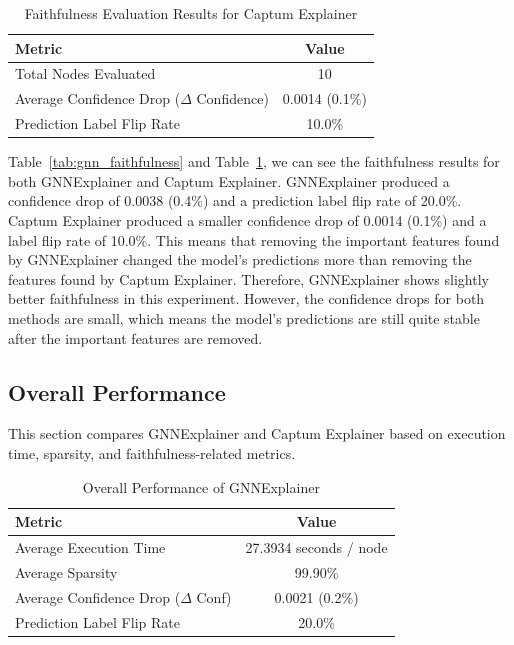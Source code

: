 \documentclass[runningheads]{llncs}
\begin{document}
\begin{table}[ht]
\centering
\caption{Faithfulness Evaluation Results for Captum Explainer}
\label{tab:captum_faithfulness}
\begin{tabular}{lc}
\hline
\textbf{Metric} & \textbf{Value} \\
\hline
Total Nodes Evaluated & 10 \\
Average Confidence Drop ($\Delta$ Confidence) & 0.0014 (0.1\%) \\
Prediction Label Flip Rate & 10.0\% \\
\hline
\end{tabular}
\end{table}

Table~\ref{tab:gnn_faithfulness} and Table~\ref{tab:captum_faithfulness}, we can see the faithfulness results for both GNNExplainer and Captum Explainer. GNNExplainer produced a confidence drop of 0.0038 (0.4\%) and a prediction label flip rate of 20.0\%. Captum Explainer produced a smaller confidence drop of 0.0014 (0.1\%) and a label flip rate of 10.0\%. This means that removing the important features found by GNNExplainer changed the model's predictions more than removing the features found by Captum Explainer. Therefore, GNNExplainer shows slightly better faithfulness in this experiment. However, the confidence drops for both methods are small, which means the model's predictions are still quite stable after the important features are removed.


\subsection{Overall Performance}

This section compares GNNExplainer and Captum Explainer based on execution time, sparsity, and faithfulness-related metrics.

\begin{table}[ht]
\centering
\caption{Overall Performance of GNNExplainer}
\label{tab:gnn_overall}
\begin{tabular}{lc}
\hline
\textbf{Metric} & \textbf{Value} \\
\hline
Average Execution Time & 27.3934 seconds / node \\
Average Sparsity & 99.90\% \\
Average Confidence Drop ($\Delta$ Conf) & 0.0021 (0.2\%) \\
Prediction Label Flip Rate & 20.0\% \\
\hline
\end{tabular}
\end{table}
\end{document}
